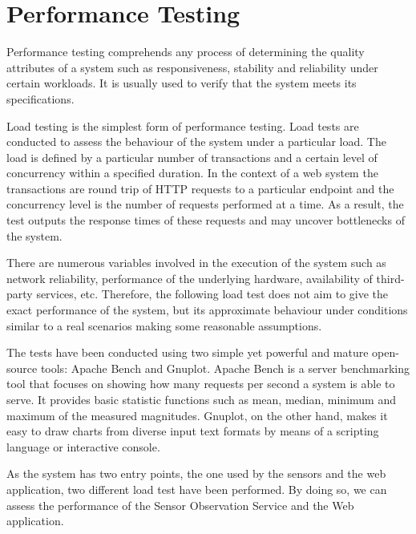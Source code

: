 \chapter{Performance Testing}

Performance testing comprehends any process of determining the quality attributes of a system such as responsiveness, stability and reliability under certain workloads. It is usually used to verify that the system meets its specifications.

Load testing is the simplest form of performance testing. Load tests are conducted to assess the behaviour of the system under a particular load. The load is defined by a particular number of transactions and a certain level of concurrency within a specified duration. In the context of a web system the transactions are round trip of HTTP requests to a particular endpoint and the concurrency level is the number of requests performed at a time. As a result, the test outputs the response times of these requests and may uncover bottlenecks of the system.

There are numerous variables involved in the execution of the system such as network reliability, performance of the underlying hardware, availability of third-party services, etc. Therefore, the following load test does not aim to give the exact performance of the system, but its approximate behaviour under conditions similar to a real scenarios making some reasonable assumptions.

The tests have been conducted using two simple yet powerful and mature open-source tools: Apache Bench and Gnuplot. Apache Bench is a server benchmarking tool that focuses on showing how many requests per second a system is able to serve. It provides basic statistic functions such as mean, median, minimum and maximum of the measured magnitudes. Gnuplot, on the other hand, makes it easy to draw charts from diverse input text formats by means of a scripting language or interactive console.

As the system has two entry points, the one used by the sensors and the web application, two different load test have been performed. By doing so, we can assess the performance of the Sensor Observation Service and the Web application.

